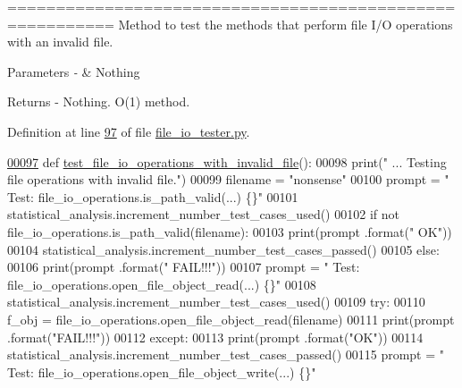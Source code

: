========================================================= Method to test the methods that perform file I/\+O operations with an invalid file. 


\begin{DoxyParams}{Parameters}
{\em -\/} & Nothing \\
\hline
\end{DoxyParams}
\begin{DoxyReturn}{Returns}
-\/ Nothing. O(1) method. 
\end{DoxyReturn}


Definition at line \hyperlink{file__io__tester_8py_source_l00097}{97} of file \hyperlink{file__io__tester_8py_source}{file\+\_\+io\+\_\+tester.\+py}.


\begin{DoxyCode}
\hypertarget{classutilities_1_1file__io__tester_1_1file__io__operations__tester_l00097}{}\hyperlink{classutilities_1_1file__io__tester_1_1file__io__operations__tester_a847cc701af96fbf9558cdae859f379d6}{00097}     \textcolor{keyword}{def }\hyperlink{classutilities_1_1file__io__tester_1_1file__io__operations__tester_a847cc701af96fbf9558cdae859f379d6}{test\_file\_io\_operations\_with\_invalid\_file}():
00098         print(\textcolor{stringliteral}{" ... Testing file operations with invalid file."})
00099         filename = \textcolor{stringliteral}{"nonsense"}
00100         prompt = \textcolor{stringliteral}{"  Test: file\_io\_operations.is\_path\_valid(...) \{\}"}
00101         statistical\_analysis.increment\_number\_test\_cases\_used()
00102         \textcolor{keywordflow}{if} \textcolor{keywordflow}{not} file\_io\_operations.is\_path\_valid(filename):
00103             print(prompt .format(\textcolor{stringliteral}{"  OK"}))
00104             statistical\_analysis.increment\_number\_test\_cases\_passed()
00105         \textcolor{keywordflow}{else}:
00106             print(prompt .format(\textcolor{stringliteral}{"  FAIL!!!"}))
00107         prompt = \textcolor{stringliteral}{"  Test: file\_io\_operations.open\_file\_object\_read(...) \{\}"}
00108         statistical\_analysis.increment\_number\_test\_cases\_used()
00109         \textcolor{keywordflow}{try}:
00110             f\_obj = file\_io\_operations.open\_file\_object\_read(filename)
00111             print(prompt .format(\textcolor{stringliteral}{"FAIL!!!"}))
00112         \textcolor{keywordflow}{except}:
00113             print(prompt .format(\textcolor{stringliteral}{"OK"}))
00114             statistical\_analysis.increment\_number\_test\_cases\_passed()
00115         prompt = \textcolor{stringliteral}{"  Test: file\_io\_operations.open\_file\_object\_write(...)    \{\}"}

\end{DoxyCode}
